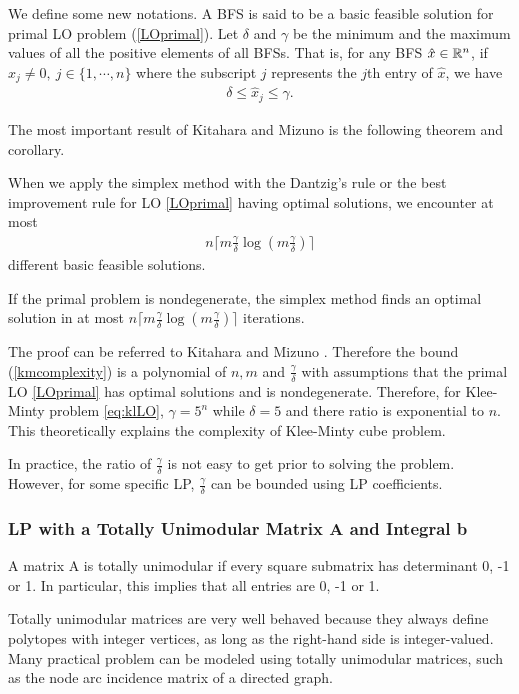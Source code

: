 \documentclass[11pt]{article}
\begin{document}
We define some new notations. A BFS is said to be a basic feasible solution for primal LO problem (\ref{LOprimal}). Let $\delta$ and $\gamma$ be the minimum and the maximum values of all the positive elements of all BFSs. That is, for any BFS $\hat{x} \in \mathbb{R}^{n}$, if $\hat{x}_j \neq 0, \ j \in \{1, \cdots, n\}$ where the subscript $j$ represents the $j$th entry of $\hat{x}$, we have 
\begin{align}
\delta \le \hat{x}_j \le \gamma. \label{eq:bfsbound}
\end{align} 

The most important result of Kitahara and Mizuno \cite{kitahara2013bound} is the following theorem and corollary.
\begin{theorem}
When we apply the simplex method with the Dantzig's rule or the best improvement rule for LO \ref{LOprimal} having optimal solutions, we encounter at most
\begin{align}
n\lceil m \frac{\gamma}{\delta}\log(m\frac{\gamma}{\delta})\rceil \label{kmcomplexity}
\end{align}
different basic feasible solutions. \label{KTheorem1}
\end{theorem}

\begin{corollary}
 If the primal problem is nondegenerate, the simplex method finds an optimal solution in at most $n\lceil m \frac{\gamma}{\delta}\log(m\frac{\gamma}{\delta})\rceil$ iterations.
\end{corollary}

The proof can be referred to Kitahara and Mizuno \cite{kitahara2013bound}. Therefore the bound (\ref{kmcomplexity}) is a polynomial of $n, m$ and $\frac{\gamma}{\delta}$ with assumptions that the primal LO \ref{LOprimal} has optimal solutions and is nondegenerate. Therefore, for Klee-Minty problem \ref{eq:klLO}, $\gamma = 5^n$ while $\delta = 5$ and there ratio is exponential to $n$. This theoretically explains the complexity of Klee-Minty cube problem.

In practice, the ratio of $\frac{\gamma}{\delta}$ is not easy to get prior to solving the problem. However, for some specific LP, $\frac{\gamma}{\delta}$ can be bounded using LP coefficients. 

\subsubsection{LP with a Totally Unimodular Matrix A and Integral b}
\begin{definition}
A matrix A is totally unimodular if every square submatrix has determinant 0, -1 or 1. In particular, this implies that all entries are 0, -1 or 1.
\end{definition}
Totally unimodular matrices are very well behaved because they always define polytopes with integer vertices, as long as the right-hand side is integer-valued. Many practical problem can be modeled using totally unimodular matrices, such as the node arc incidence matrix of a directed graph.
\end{document}
